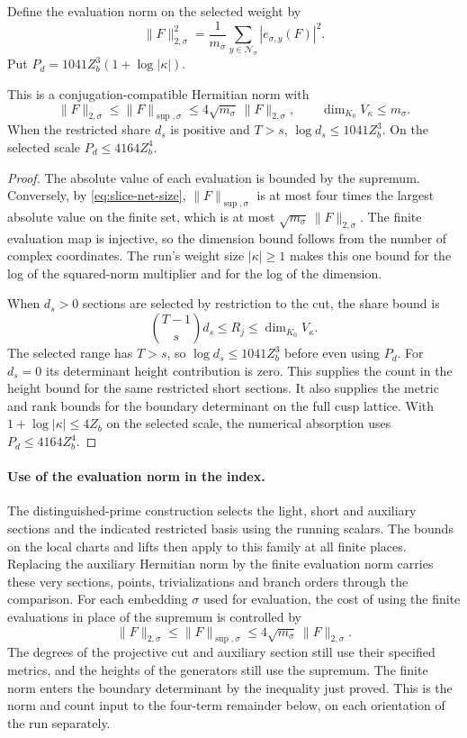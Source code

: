 Define the evaluation norm on the selected weight by
\[
 \|F\|_{2,\sigma}^2
    =\frac1{m_\sigma}\sum_{y\in\mathcal N_\sigma}|e_{\sigma,y}(F)|^2 .
\]
Put \(P_d=1041Z_b^3(1+\log|\kappa|)\).

\begin{proposition}\label{prop:slice-evaluation-norm}
This is a conjugation-compatible Hermitian norm with
\[
 \|F\|_{2,\sigma}\le\|F\|_{\sup,\sigma}
       \le 4\sqrt{m_\sigma}\,\|F\|_{2,\sigma},\qquad
 \dim_{K_0} V_\kappa\le m_\sigma.
\]
When the restricted share \(d_s\) is positive and \(T>s\),
\(\log d_s\le1041Z_b^3\). On the selected scale
\(P_d\le4164Z_b^4\).
\end{proposition}

\begin{proof}
The absolute value of each evaluation is bounded by the supremum. Conversely, by
\eqref{eq:slice-net-size}, \(\|F\|_{\sup,\sigma}\) is at most
four times the largest absolute value on the finite set, which is at most
\(\sqrt{m_\sigma}\,\|F\|_{2,\sigma}\). The finite evaluation
map is injective, so the dimension bound follows from the
number of complex coordinates.
The run's weight size \(|\kappa|\ge1\) makes this one bound
for the log of the squared-norm multiplier and for the log
of the dimension.

When \(d_s>0\) sections are selected by
restriction to the cut, the share bound is
\[
 \binom{T-1}{s}d_s\le R_j\le\dim_{K_0}V_\kappa.
\]
The selected range has \(T>s\), so
\(\log d_s\le1041Z_b^3\) before even using \(P_d\).
For \(d_s=0\) its determinant height contribution is zero.
This supplies the count in the height bound for the same
restricted short sections. It also supplies the metric and
rank bounds for the boundary determinant on the full cusp
lattice. With \(1+\log|\kappa|\le4Z_b\) on the selected
scale, the numerical absorption uses \(P_d\le4164Z_b^4\).

\end{proof}

\paragraph{Use of the evaluation norm in the index.}
The distinguished-prime construction selects the light,
short and auxiliary sections and the indicated restricted
basis using the running scalars. The bounds on the local
charts and lifts then apply to this family at all finite
places. Replacing the auxiliary Hermitian norm by the
finite evaluation norm carries these very sections, points,
trivializations and branch orders through the comparison.
For each embedding \(\sigma\) used for evaluation, the cost of using the finite evaluations in place of the supremum is controlled by
\[
  \|F\|_{2,\sigma}\le\|F\|_{\sup,\sigma}\le4\sqrt{m_\sigma}\,\|F\|_{2,\sigma}.
\]
The degrees of the projective cut and auxiliary section
still use their specified metrics, and the heights of the
generators still use the supremum. The finite norm enters the
boundary determinant by the inequality just proved. This is
the norm and count input to the four-term remainder below,
on each orientation of the run separately.
\label{cor:slice-evaluation-net-7}
